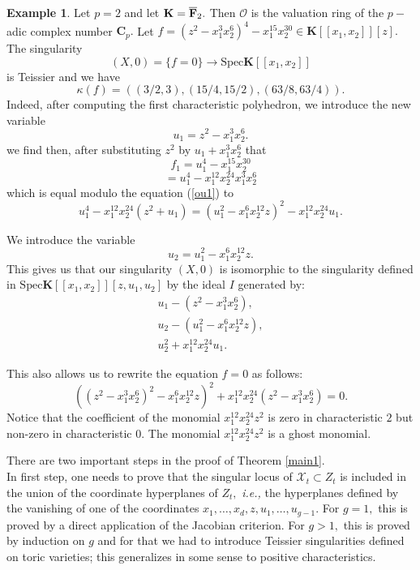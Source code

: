 \documentclass[11pt, a4paper]{amsart}
\numberwithin{equation}{section}
\theoremstyle{plain}
\theoremstyle{definition}
\newtheorem{Ex}[Thm]{Example}
\theoremstyle{remark}
\newcommand{\K}{\mathbf{K}}
\newcommand{\cX}{\mathcal{X}}
\newcommand{\0}{{\boldsymbol 0}}
\begin{document}
\begin{Ex}\label{purinsep}
Let $p=2$ and let $\K=\overline{\bf{F}}_2.$ Then $\mathcal{O}$ is the valuation ring of the $p-$adic complex number $\mathbf{C}_p.$
Let $f=(z^2-x_1^3x_2^6)^4-x_1^{15}x_2^{30} \in \K[[x_1,x_2]][z].$
The singularity 
$$(X,0)=\{f=0\}\to \mathrm{Spec}\K[[x_1,x_2]]$$ is Teissier and we have $$\kappa(f)=((3/2,3),(15/4,15/2),(63/8,63/4)).$$ Indeed, after computing the first characteristic polyhedron, we introduce the new variable 
\begin{equation}\label{ou1}
u_1=z^2-x_1^3x_2^6.
\end{equation}
we find then, after substituting $z^2$ by $u_1+x_1^3x_2^6$ that
$$f_1=u_1^4-x_1^{15}x_2^{30}$$
$$= u_1^4-x_1^{12}x_2^{24}x_1^3x_2^6$$
which is equal modulo the equation (\ref{ou1}) to
$$ u_1^4-x_1^{12}x_2^{24}(z^2+u_1)=(u_1^2-x_1^6x_2^{12}z)^2-x_1^{12}x_2^{24}u_1.$$

We introduce the variable $$u_2=u_1^2-x_1^6x_2^{12}z.$$
This gives us that our singularity $(X,0)$ is isomorphic to the singularity defined in $\mathrm{Spec}\K[[x_1,x_2]][z,u_1,u_2]$ by
the ideal $I$ generated by:
$$
\begin{array}{ll}
    u_1-(z^2-x_1^3x_2^6),\\
     u_2-(u_1^2-x_1^6x_2^{12}z),\\
u_2^2+x_1^{12}x_2^{24}u_1.
     \end{array} 
$$

This also allows us to rewrite the equation $f=0$ as follows:
$$((z^2-x_1^3x_2^6)^2-x_1^6x_2^{12}z)^2+x_1^{12}x_2^{24}(z^2-x_1^3x_2^6)=0.$$
Notice that the coefficient of the monomial $x_1^{12}x_2^{24}z^2$ is zero in characteristic $2$ but non-zero in characteristic $0.$ The monomial $x_1^{12}x_2^{24}z^2$ is a ghost monomial.
\end{Ex}   

There are two important steps in the proof of Theorem \ref{main1}.\\

In first step, one needs to prove that the singular locus of $\cX_t\subset Z_t$ is included in the union of the coordinate hyperplanes of $Z_t,$ \textit{i.e.,} the hyperplanes defined by
the vanishing of one of the coordinates $x_1,\ldots,x_d,z,u_1,\ldots,u_{g-1}$. For $g=1,$ this is proved by a direct application of the Jacobian criterion. For $g>1,$ this is proved by induction on $g$ and for that we had to introduce Teissier singularities defined on toric varieties; this generalizes in some sense \cite{Pedro2} to positive characteristics.\\
\end{document}
